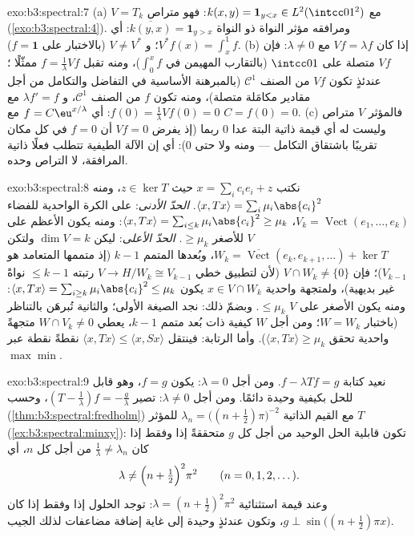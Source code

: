 \begin{solution}{exo:b3:spectral:7}
(a) $V = T_k$ مع $k(x, y) = \mathbf 1_{y < x} \in
L^2(\intcc01^2)$: فهو متراص (\cref{exo:b3:spectral:4}). ومرافقه مؤثر
النواة ذو النواة $\overline{k(y,
x)} = \mathbf 1_{y > x}$: أي $V^*f(x) = \int_x^1f$؛ و $V \neq V^*$ (بالاختبار
على $f = \mathbf 1$).
(b) إذا كان $Vf = \lambda f$ مع $\lambda \ne 0$: فإن $Vf$ متصلة
على $\intcc01$ (بالتقارب المهيمن في $\int_0^x f$)، ومنه تقبل
$f
= \frac1\lambda Vf$ ممثّلًا ؛ عندئذٍ تكون $Vf$ من الصنف
$\mathcal C^1$ (بالمبرهنة الأساسية في التفاضل والتكامل من أجل
مقادير مكامَلة متصلة)، ومنه تكون $f$ من الصنف $\mathcal C^1$،
و $\lambda f' = f$ مع $f(0) = \frac1\lambda Vf(0) = 0$: أي $f =
C\eu^{x/\lambda}$ مع $C = f(0) = 0$.
(c) فالمؤثر $V$ متراص وليست له أي قيمة ذاتية البتة عدا $0$
ربما (إذ يفرض $Vf = 0$ أن $f = 0$ في كل مكان تقريبًا باشتقاق
التكامل --- ومنه ولا حتى $0$): أي إن الآلة الطيفية تتطلب فعلًا
ذاتية المرافقة، لا التراص وحده.
\end{solution}

\begin{solution}{exo:b3:spectral:8}
نكتب $x = \sum_ic_ie_i + z$ حيث $z \in \ker T$، ومنه $\langle x,
Tx\rangle = \sum_i\mu_i\abs{c_i}^2$. \emph{الحدّ
الأدنى}: على الكرة الواحدية للفضاء $V_k = \operatorname{Vect}(e_1, \dots,
e_k)$، $\langle x, Tx\rangle = \sum_{i\leq
k}\mu_i\abs{c_i}^2 \geq \mu_k$: ومنه يكون
الأعظم على $V$ للأصغر $\geq \mu_k$. \emph{الحدّ الأعلى}: ليكن
$\dim V = k$ ولتكن $W_k
= \overline{\operatorname{Vect}}(e_k, e_{k+1}, \dots) +
\ker T$، وبُعدها المتمم $k - 1$ (إذ متممها
المتعامد هو $V_{k-1}$)؛ فإن $V \cap W_k \neq \{0\}$ (لأن لتطبيق خطي $V \to
H/W_k \cong V_{k-1}$ رتبته
$\leq k - 1$ نواةً غير بديهية)، ولمتجهة واحدية $x \in V\cap W_k$ يكون
$\langle x,
Tx\rangle = \sum_{i \geq k}\mu_i\abs{c_i}^2 \leq \mu_k$: ومنه يكون الأصغر على $V$ $\leq \mu_k$.
وبضمّ ذلك: نجد الصيغة الأولى؛ والثانية تُبرهَن بالتناظر (باختبار
$W = W_k$؛ ومن أجل $W$ كيفية ذات بُعد متمم $k-1$، يعطي $W \cap V_k \neq 0$
متجهةً واحدية تحقق $\langle x, Tx\rangle \geq \mu_k$). وأما الرتابة: فينتقل $\langle x, Tx\rangle \leq \langle x,
Sx\rangle$ نقطةً
نقطة عبر $\max\min$.
\end{solution}

\begin{solution}{exo:b3:spectral:9}
نعيد كتابة $f - \lambda Tf = g$. ومن أجل $\lambda = 0$: يكون $f = g$، وهو
قابل للحل بكيفية وحيدة دائمًا. ومن أجل $\lambda \neq 0$: تصير
$(T - \frac1\lambda)f = -\frac g\lambda$، وحسب  (\cref{thm:b3:spectral:fredholm}) مع القيم الذاتية
$\lambda_n = \bigl((n + \frac12)\pi\bigr)^{-2}$ للمؤثر $T$ (\cref{ex:b3:spectral:minxy}): تكون قابلية الحل الوحيد من أجل
كل $g$ متحققةً إذا وفقط إذا كان $\frac1\lambda \neq \lambda_n$ من أجل كل $n$، أي
\[
\lambda \neq \Bigl(n + \tfrac12\Bigr)^2\pi^2
\qquad (n = 0, 1, 2, \dots).
\]
وعند قيمة استثنائية $\lambda = (n+\frac12)^2\pi^2$: توجد الحلول إذا وفقط إذا كان
$g \perp \sin\bigl((n{+}\frac12)\pi x\bigr)$، وتكون عندئذٍ وحيدة إلى غاية إضافة مضاعفات لذلك الجيب.
\end{solution}

